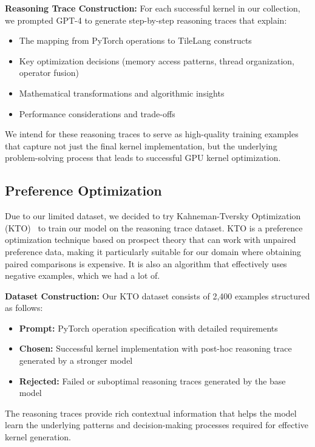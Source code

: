 \documentclass{article}
\begin{document}
\textbf{Reasoning Trace Construction:} For each successful kernel in our collection, we prompted GPT-4 to generate step-by-step reasoning traces that explain:
\begin{itemize}
\item The mapping from PyTorch operations to TileLang constructs
\item Key optimization decisions (memory access patterns, thread organization, operator fusion)
\item Mathematical transformations and algorithmic insights
\item Performance considerations and trade-offs
\end{itemize}

We intend for these reasoning traces to serve as high-quality training examples that capture not just the final kernel implementation, but the underlying problem-solving process that leads to successful GPU kernel optimization.

\subsection{Preference Optimization}

Due to our limited dataset, we decided to try Kahneman-Tversky Optimization (KTO)~\cite{ethayarajh2024ktomodelalignmentprospect} to train our model on the reasoning trace dataset. KTO is a preference optimization technique based on prospect theory that can work with unpaired preference data, making it particularly suitable for our domain where obtaining paired comparisons is expensive. It is also an algorithm that effectively uses negative examples, which we had a lot of. 

\textbf{Dataset Construction:} Our KTO dataset consists of 2,400 examples structured as follows:
\begin{itemize}
\item \textbf{Prompt:} PyTorch operation specification with detailed requirements
\item \textbf{Chosen:} Successful kernel implementation with post-hoc reasoning trace generated by a stronger model
\item \textbf{Rejected:} Failed or suboptimal reasoning traces generated by the base model
\end{itemize}

The reasoning traces provide rich contextual information that helps the model learn the underlying patterns and decision-making processes required for effective kernel generation.
\end{document}
